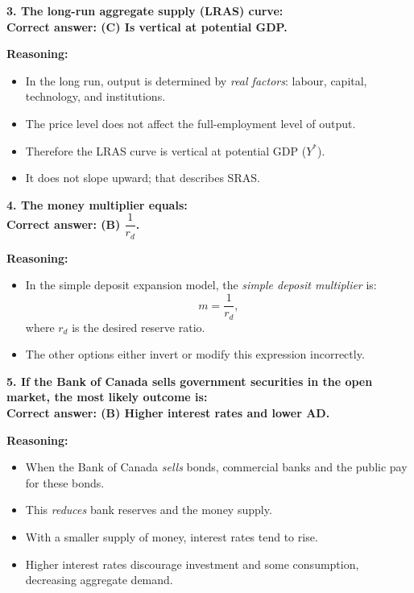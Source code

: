 \documentclass[12pt]{article}
\begin{document}
\newpage

\textbf{3. The long-run aggregate supply (LRAS) curve:}\\
\textbf{Correct answer: (C) Is vertical at potential GDP.}

\textbf{Reasoning:}
\begin{itemize}
    \item In the long run, output is determined by \emph{real factors}: labour, capital, technology, and institutions.
    \item The price level does not affect the full-employment level of output.
    \item Therefore the LRAS curve is vertical at potential GDP (\(Y^*\)).
    \item It does not slope upward; that describes SRAS.
\end{itemize}

\bigskip

\textbf{4. The money multiplier equals:}\\
\textbf{Correct answer: (B) $\dfrac{1}{r_d}$.}

\textbf{Reasoning:}
\begin{itemize}
    \item In the simple deposit expansion model, the \emph{simple deposit multiplier} is:
    \[
    m = \frac{1}{r_d},
    \]
    where \(r_d\) is the desired reserve ratio.
    \item The other options either invert or modify this expression incorrectly.
\end{itemize}

\bigskip

\textbf{5. If the Bank of Canada sells government securities in the open market, the most likely outcome is:}\\
\textbf{Correct answer: (B) Higher interest rates and lower AD.}

\textbf{Reasoning:}
\begin{itemize}
    \item When the Bank of Canada \emph{sells} bonds, commercial banks and the public pay for these bonds.
    \item This \emph{reduces} bank reserves and the money supply.
    \item With a smaller supply of money, interest rates tend to rise.
    \item Higher interest rates discourage investment and some consumption, decreasing aggregate demand.
\end{itemize}
\newpage
\end{document}
